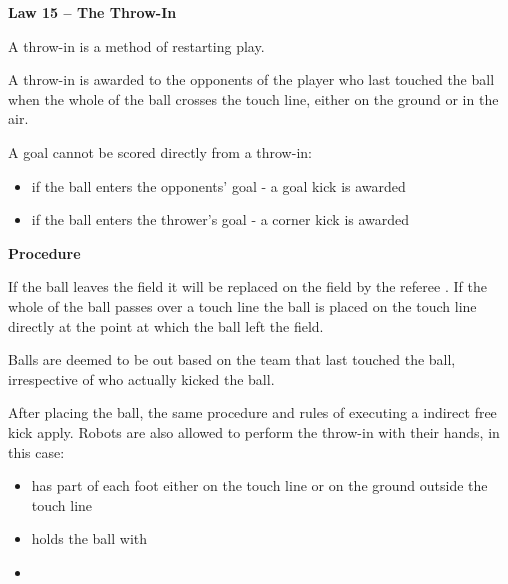 \clearpage
\sffamily
{\bfseries
\textcolor[rgb]{0.4,0.4,0.4}{Law 15 -- The Throw-In} }
{}


\bigskip

A throw-in is a method of restarting play.

\bigskip

A throw-in is awarded to the opponents of the player who last touched the ball when the whole of the ball crosses the touch line, either on the ground or in the air.


\bigskip

A goal cannot be scored directly from a throw-in:
\begin{itemize}
\item if the ball enters the opponents' goal - a goal kick is awarded
\item if the ball enters the thrower's goal - a corner kick is awarded
\end{itemize}

\bigskip

{\bfseries Procedure }

\headlinebox 

If the ball leaves the field it will be replaced on the field by the referee .
If the whole of the ball passes over a touch line the ball is placed on the
touch line directly at the point at which the ball left the field.

\bigskip

Balls are deemed to be out based on the team that last touched the ball,
irrespective of who actually kicked the ball.

\bigskip

After placing the ball, the same procedure and rules of executing a indirect free kick apply.
Robots are also allowed to perform the throw-in with their hands, in this case:

\begin{itemize}
\item has part of each foot either on the touch line or on the ground outside
      the touch line
\item holds the ball with  
\item {}
\end{itemize}

